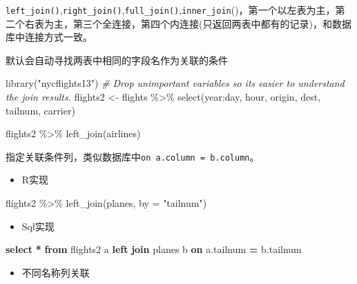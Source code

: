\documentclass[
]{book}
\newenvironment{Shaded}{\begin{snugshade}}{\end{snugshade}}
\newcommand{\AttributeTok}[1]{\textcolor[rgb]{0.77,0.63,0.00}{#1}}
\newcommand{\CommentTok}[1]{\textcolor[rgb]{0.56,0.35,0.01}{\textit{#1}}}
\newcommand{\FunctionTok}[1]{\textcolor[rgb]{0.00,0.00,0.00}{#1}}
\newcommand{\KeywordTok}[1]{\textcolor[rgb]{0.13,0.29,0.53}{\textbf{#1}}}
\newcommand{\NormalTok}[1]{#1}
\newcommand{\OperatorTok}[1]{\textcolor[rgb]{0.81,0.36,0.00}{\textbf{#1}}}
\newcommand{\OtherTok}[1]{\textcolor[rgb]{0.56,0.35,0.01}{#1}}
\newcommand{\SpecialCharTok}[1]{\textcolor[rgb]{0.00,0.00,0.00}{#1}}
\newcommand{\StringTok}[1]{\textcolor[rgb]{0.31,0.60,0.02}{#1}}
\providecommand{\tightlist}{%
  \setlength{\itemsep}{0pt}\setlength{\parskip}{0pt}}
\begin{document}
\texttt{left\_join()},\texttt{right\_join()},\texttt{full\_join()},\texttt{inner\_join}()，第一个以左表为主，第二个右表为主，第三个全连接，第四个内连接(只返回两表中都有的记录)，和数据库中连接方式一致。

默认会自动寻找两表中相同的字段名作为关联的条件

\begin{Shaded}
\begin{Highlighting}[]
\FunctionTok{library}\NormalTok{(}\StringTok{"nycflights13"}\NormalTok{)}
\CommentTok{\# Drop unimportant variables so it\textquotesingle{}s easier to understand the join results.}
\NormalTok{flights2 }\OtherTok{\textless{}{-}}\NormalTok{ flights }\SpecialCharTok{\%\textgreater{}\%} \FunctionTok{select}\NormalTok{(year}\SpecialCharTok{:}\NormalTok{day, hour, origin, dest, tailnum, carrier)}

\NormalTok{flights2 }\SpecialCharTok{\%\textgreater{}\%} 
  \FunctionTok{left\_join}\NormalTok{(airlines)}
\end{Highlighting}
\end{Shaded}

指定关联条件列，类似数据库中\texttt{on\ a.column\ =\ b.column}。

\begin{itemize}
\tightlist
\item
  R实现
\end{itemize}

\begin{Shaded}
\begin{Highlighting}[]
\NormalTok{flights2 }\SpecialCharTok{\%\textgreater{}\%} \FunctionTok{left\_join}\NormalTok{(planes, }\AttributeTok{by =} \StringTok{"tailnum"}\NormalTok{)}
\end{Highlighting}
\end{Shaded}

\begin{itemize}
\tightlist
\item
  Sql实现
\end{itemize}

\begin{Shaded}
\begin{Highlighting}[]
\KeywordTok{select} \OperatorTok{*} \KeywordTok{from}\NormalTok{ flights2 a }\KeywordTok{left} \KeywordTok{join}\NormalTok{ planes b }\KeywordTok{on}\NormalTok{ a.tailnum }\OperatorTok{=}\NormalTok{ b.tailnum }
\end{Highlighting}
\end{Shaded}

\begin{itemize}
\tightlist
\item
  不同名称列关联
\end{itemize}
\end{document}
